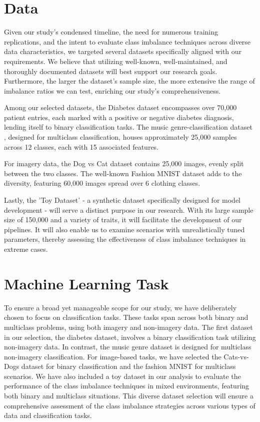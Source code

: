\documentclass[journal]{IEEEtran}
\begin{document}
	
	\section{Data}
	
		Given our study's condensed timeline, the need for numerous training replications, and the intent to evaluate class imbalance techniques across diverse data characteristics, we targeted several datasets specifically aligned with our requirements. We believe that utilizing well-known, well-maintained, and thoroughly documented datasets will best support our research goals. Furthermore, the larger the dataset's sample size, the more extensive the range of imbalance ratios we can test, enriching our study's comprehensiveness.
		
		Among our selected datasets, the Diabetes\cite{cdc2022} dataset encompasses over 70,000 patient entries, each marked with a positive or negative diabetes diagnosis, lending itself to binary classification tasks. The music genre-classification dataset \cite{Music_Genre_Classification}, designed for multiclass classification, houses approximately 25,000 samples across 12 classes, each with 15 associated features.
		
		For imagery data, the Dog vs Cat dataset \cite{Cats-vs-Dogs} contains 25,000 images, evenly split between the two classes. The well-known Fashion MNIST dataset \cite{Fashion_MNIST} adds to the diversity, featuring 60,000 images spread over 6 clothing classes.
		
		Lastly, the 'Toy Dataset'\cite{Toy_Dataset} - a synthetic dataset specifically designed for model development - will serve a distinct purpose in our research. With its large sample size of 150,000 and a variety of traits, it will facilitate the development of our pipelines. It will also enable us to examine scenarios with unrealistically tuned parameters, thereby assessing the effectiveness of class imbalance techniques in extreme cases.
 

	\section{Machine Learning Task}
		
		To ensure a broad yet manageable scope for our study, we have deliberately chosen to focus on classification tasks. These tasks span across both binary and multiclass problems, using both imagery and non-imagery data. The first dataset in our selection, the diabetes dataset, involves a binary classification task utilizing non-imagery data. In contrast, the music genre dataset is designed for multiclass non-imagery classification. For image-based tasks, we have selected the Cats-vs-Dogs dataset for binary classification and the fashion MNIST for multiclass scenarios. We have also included a toy dataset in our analysis to evaluate the performance of the class imbalance techniques in mixed environments, featuring both binary and multiclass situations. This diverse dataset selection will ensure a comprehensive assessment of the class imbalance strategies across various types of data and classification tasks.
\end{document}
